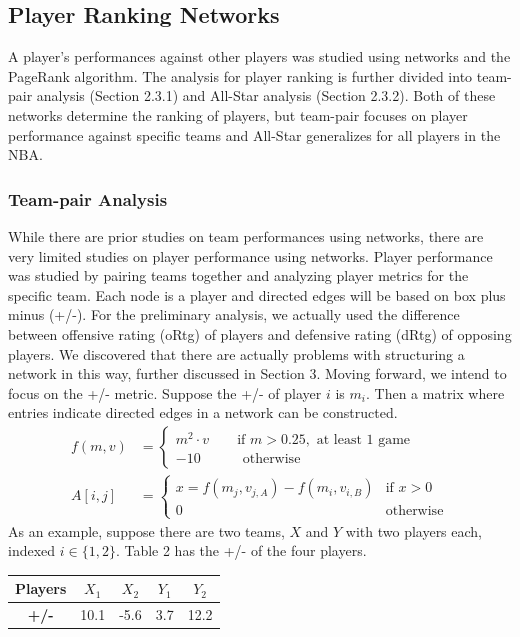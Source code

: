 \documentclass[12pt]{article}%
\begin{document}
\subsection{Player Ranking Networks}
\null\quad\quad A player's performances against other players was studied using networks and the PageRank algorithm. The analysis for player ranking is further divided into team-pair analysis (Section 2.3.1) and All-Star analysis (Section 2.3.2). Both of these networks determine the ranking of players, but team-pair focuses on player performance against specific teams and All-Star generalizes for all players in the NBA.
\subsubsection{Team-pair Analysis}
\null\quad\quad While there are prior studies on team performances using networks, there are very limited studies on player performance using networks. Player performance was studied by pairing teams together and analyzing player metrics for the specific team. Each node is a player and directed edges will be based on box plus minus (+/-). For the preliminary analysis, we actually used the difference between offensive rating (oRtg) of players and defensive rating (dRtg) of opposing players. We discovered that there are actually problems with structuring a network in this way, further discussed in Section 3. Moving forward, we intend to focus on the +/- metric. Suppose the +/- of player $i$ is $m_i$. Then a matrix where entries indicate directed edges in a network can be constructed.
  \begin{align*}
  f(m,v)&=\begin{cases}
  m^2\cdot v\quad\quad \text{if }m>0.25,\text{ at least 1 game}\\
  -10\quad\quad\quad\text{otherwise}
  \end{cases}\\
  A[i,j]&=
  \begin{cases}
  x=f(m_j,v_{j,A})-f(m_i, v_{i,B}) &\text{if }x>0\\
  0 &\text{otherwise}
  \end{cases}
  \end{align*}
As an example, suppose there are two teams, $X$ and $Y$ with two players each, indexed $i\in\{1,2\}$. Table 2 has the +/- of the four players.
\begin{center}
\begin{tabular}{|c|c c c c|}
\hline
\textbf{Players} & $X_1$ & $X_2$ & $Y_1$ & $Y_2$\\
\hline
\textbf{+/-} & 10.1 & -5.6 & 3.7 & 12.2 \\
\hline
\end{tabular}
\end{center}
\end{document}
